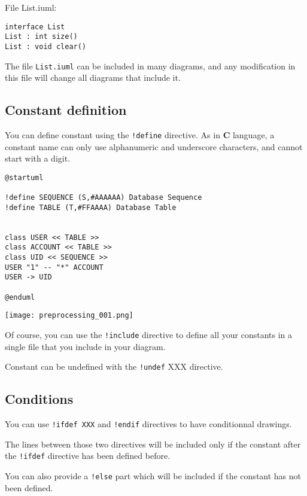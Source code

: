 File List.iuml: 
\begin{lstlisting}
interface List 
List : int size()
List : void clear() 
\end{lstlisting}


The file \texttt{List.iuml} can be included in many diagrams, and any
modification in this file will change all diagrams that include it. 

\newpage \subsection{Constant definition} 

You can define constant using the \texttt{!define} directive. As in \textbf{C}
language, a constant name can only use alphanumeric and underscore characters, and cannot start with a digit. 

\begin{lstlisting}
@startuml 

!define SEQUENCE (S,#AAAAAA) Database Sequence
!define TABLE (T,#FFAAAA) Database Table 


class USER << TABLE >> 
class ACCOUNT << TABLE >> 
class UID << SEQUENCE >>
USER "1" -- "*" ACCOUNT 
USER -> UID 

@enduml 
\end{lstlisting}
\begin{center}
\texttt{[image: preprocessing\_001.png]}
\end{center}



Of course, you can use the \texttt{!include} directive to define all your
constants in a single file that you include in your diagram. 

Constant can be undefined with the \texttt{!undef} XXX directive. 

\newpage \subsection{Conditions} 

You can use \texttt{!ifdef XXX} and \texttt{!endif} directives to have
conditionnal drawings.

The lines between those two directives will be included only if the constant
after the \texttt{!ifdef} directive has been defined before. 

You can also provide a \texttt{!else} part which will be included if the
constant has not been defined.

